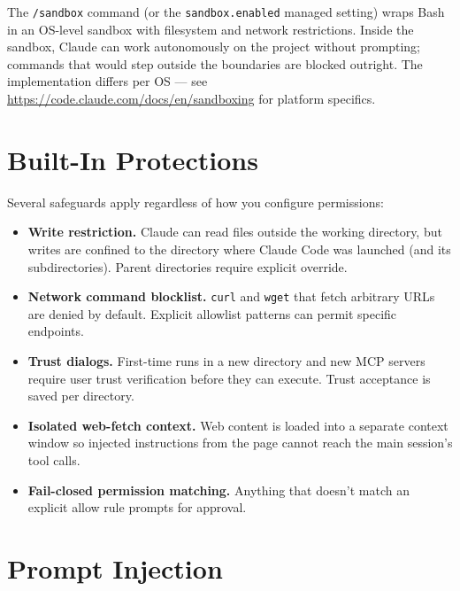
The \texttt{/sandbox} command (or the \texttt{sandbox.enabled} managed
setting) wraps Bash in an OS-level sandbox with filesystem and network
restrictions. Inside the sandbox, Claude can work autonomously on the
project without prompting; commands that would step outside the
boundaries are blocked outright. The implementation differs per OS — see
\url{https://code.claude.com/docs/en/sandboxing} for platform specifics.

\section{Built-In Protections}
\label{sec:builtin-protections}


Several safeguards apply regardless of how you configure permissions:

\begin{itemize}
  \item \textbf{Write restriction.} Claude can read files outside the
        working directory, but writes are confined to the directory
        where Claude Code was launched (and its subdirectories). Parent
        directories require explicit override.
  \item \textbf{Network command blocklist.} \texttt{curl} and
        \texttt{wget} that fetch arbitrary URLs are denied by default.
        Explicit allowlist patterns can permit specific endpoints.
  \item \textbf{Trust dialogs.} First-time runs in a new directory and
        new MCP servers require user trust verification before they can
        execute. Trust acceptance is saved per directory.
  \item \textbf{Isolated web-fetch context.} Web content is loaded into
        a separate context window so injected instructions from the page
        cannot reach the main session's tool calls.
  \item \textbf{Fail-closed permission matching.} Anything that doesn't
        match an explicit allow rule prompts for approval.
\end{itemize}

\section{Prompt Injection}
\label{sec:prompt-injection}


